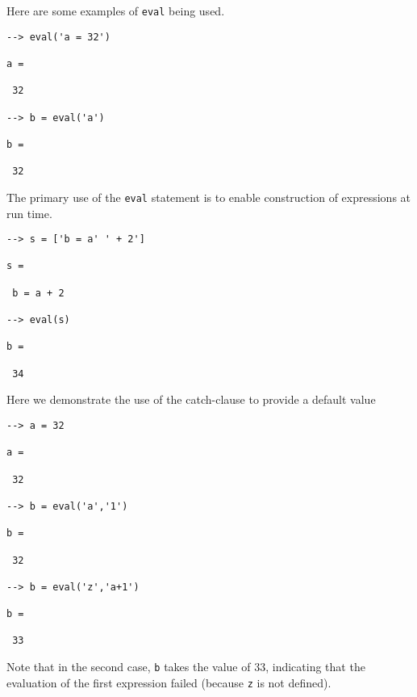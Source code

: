 Here are some examples of \verb|eval| being used.
\begin{verbatim}
--> eval('a = 32')

a = 

 32 

--> b = eval('a')

b = 

 32 
\end{verbatim}
The primary use of the \verb|eval| statement is to enable construction
of expressions at run time.
\begin{verbatim}
--> s = ['b = a' ' + 2']

s = 

 b = a + 2

--> eval(s)

b = 

 34 
\end{verbatim}
Here we demonstrate the use of the catch-clause to provide a 
default value
\begin{verbatim}
--> a = 32

a = 

 32 

--> b = eval('a','1')

b = 

 32 

--> b = eval('z','a+1')

b = 

 33 
\end{verbatim}
Note that in the second case, \verb|b| takes the value of 33, indicating
that the evaluation of the first expression failed (because \verb|z| is
not defined).

